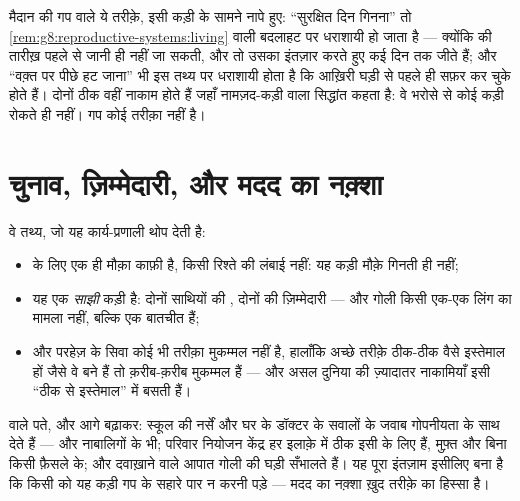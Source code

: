\begin{remark}[क्या काम नहीं करता]\label{rem:g8:contraception:notwork}
मैदान की गप वाले ये तरीक़े, इसी कड़ी के सामने नापे हुए: ``सुरक्षित दिन
गिनना'' तो \cref{rem:g8:reproductive-systems:living} वाली बदलाहट पर धराशायी हो जाता
है --- क्योंकि  की तारीख़ पहले से जानी ही नहीं जा
सकती, और  तो उसका इंतज़ार करते हुए कई दिन तक जीते हैं; और ``वक़्त पर पीछे हट जाना'' भी इस
तथ्य पर धराशायी होता है कि  आख़िरी घड़ी से पहले ही सफ़र कर चुके
होते हैं। दोनों ठीक वहीं नाकाम होते हैं जहाँ नामज़द-कड़ी वाला सिद्धांत
कहता है: वे भरोसे से कोई कड़ी रोकते ही नहीं। गप कोई तरीक़ा नहीं है।
\end{remark}

\section{चुनाव, ज़िम्मेदारी, और मदद का नक़्शा}

\begin{proposition}[यह चुनाव असली है और साझा भी]\label{prop:g8:contraception:choice}
वे तथ्य, जो यह कार्य-प्रणाली थोप देती है:
\begin{itemize}
  \item {} के लिए एक ही मौक़ा काफ़ी है, किसी रिश्ते की लंबाई
        नहीं: यह कड़ी मौक़े गिनती ही नहीं;
  \item यह एक \emph{साझी} कड़ी है: दोनों साथियों की , दोनों
        की ज़िम्मेदारी ---  और गोली किसी एक-एक लिंग का मामला
        नहीं, बल्कि एक बातचीत हैं;
  \item और परहेज़ के सिवा कोई भी तरीक़ा मुकम्मल नहीं है, हालाँकि अच्छे
        तरीक़े ठीक-ठीक वैसे इस्तेमाल हों जैसे वे बने हैं तो
        क़रीब-क़रीब मुकम्मल हैं --- और असल दुनिया की ज़्यादातर
        नाकामियाँ इसी ``ठीक से इस्तेमाल'' में बसती हैं।
\end{itemize}
\end{proposition}
\admitted

\begin{example}[मदद का नक़्शा]\label{ex:g8:contraception:help}
 वाले पते, और आगे बढ़ाकर: स्कूल की नर्सें
और घर के डॉक्टर  के सवालों के जवाब गोपनीयता के साथ देते हैं ---
और नाबालिगों के भी; परिवार नियोजन केंद्र हर इलाक़े में ठीक इसी के लिए
हैं, मुफ़्त और बिना किसी फ़ैसले के; और दवाख़ाने वाले आपात गोली की घड़ी
सँभालते हैं। यह पूरा इंतज़ाम इसीलिए बना है कि किसी को यह कड़ी गप के सहारे
पार न करनी पड़े --- मदद का नक़्शा ख़ुद तरीक़े का हिस्सा है।
\end{example}

